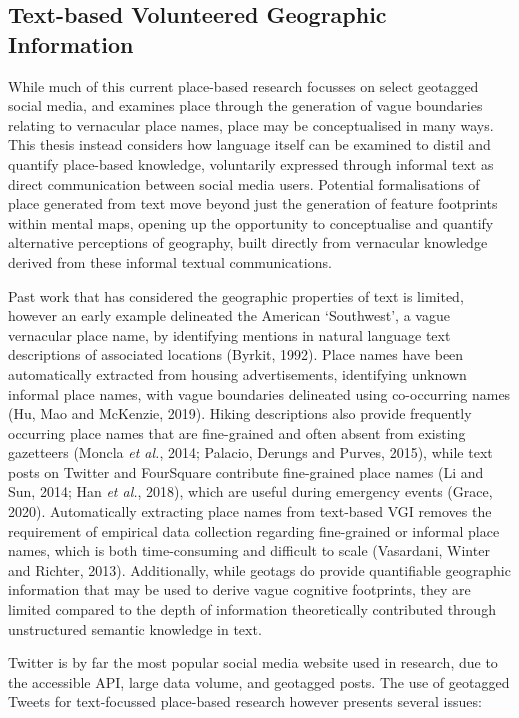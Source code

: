 \documentclass[
  letterpaper,
  11pt,
  english,
  onehalfspacing,
  headsepline]{MastersDoctoralThesis}
\begin{document}
\hypertarget{text-based-volunteered-geographic-information}{%
\subsection{Text-based Volunteered Geographic
Information}\label{text-based-volunteered-geographic-information}}

While much of this current place-based research focusses on select
geotagged social media, and examines place through the generation of
vague boundaries relating to vernacular place names, place may be
conceptualised in many ways. This thesis instead considers how language
itself can be examined to distil and quantify place-based knowledge,
voluntarily expressed through informal text as direct communication
between social media users. Potential formalisations of place generated
from text move beyond just the generation of feature footprints within
mental maps, opening up the opportunity to conceptualise and quantify
alternative perceptions of geography, built directly from vernacular
knowledge derived from these informal textual communications.

Past work that has considered the geographic properties of text is
limited, however an early example delineated the American `Southwest', a
vague vernacular place name, by identifying mentions in natural language
text descriptions of associated locations (Byrkit, 1992). Place names
have been automatically extracted from housing advertisements,
identifying unknown informal place names, with vague boundaries
delineated using co-occurring names (Hu, Mao and McKenzie, 2019). Hiking
descriptions also provide frequently occurring place names that are
fine-grained and often absent from existing gazetteers (Moncla \emph{et
al.}, 2014; Palacio, Derungs and Purves, 2015), while text posts on
Twitter and FourSquare contribute fine-grained place names (Li and Sun,
2014; Han \emph{et al.}, 2018), which are useful during emergency events
(Grace, 2020). Automatically extracting place names from text-based VGI
removes the requirement of empirical data collection regarding
fine-grained or informal place names, which is both time-consuming and
difficult to scale (Vasardani, Winter and Richter, 2013). Additionally,
while geotags do provide quantifiable geographic information that may be
used to derive vague cognitive footprints, they are limited compared to
the depth of information theoretically contributed through unstructured
semantic knowledge in text.

Twitter is by far the most popular social media website used in
research, due to the accessible API, large data volume, and geotagged
posts. The use of geotagged Tweets for text-focussed place-based
research however presents several issues:
\end{document}
